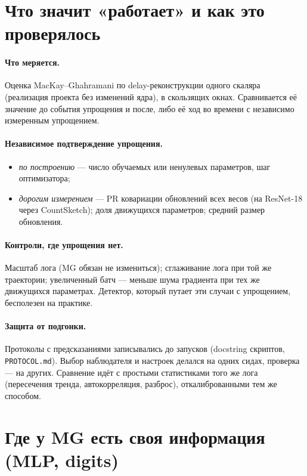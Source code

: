 \documentclass[10pt,a4paper]{article}
\begin{document}
\section{Что значит «работает» и как это проверялось}

\paragraph{Что меряется.} Оценка MacKay--Ghahramani по delay-реконструкции одного
скаляра (реализация проекта без изменений ядра), в скользящих окнах. Сравнивается
её значение до события упрощения и после, либо её ход во времени с независимо
измеренным упрощением.

\paragraph{Независимое подтверждение упрощения.}
\begin{itemize}\setlength\itemsep{0pt}
\item \emph{по построению} --- число обучаемых или ненулевых параметров, шаг
  оптимизатора;
\item \emph{дорогим измерением} --- PR ковариации обновлений всех весов (на
  ResNet-18 через CountSketch); доля движущихся параметров; средний размер
  обновления.
\end{itemize}

\paragraph{Контроли, где упрощения нет.} Масштаб лога (MG обязан не измениться);
сглаживание лога при той же траектории; увеличенный батч --- меньше шума градиента
при тех же движущихся параметрах. Детектор, который путает эти случаи с упрощением,
бесполезен на практике.

\paragraph{Защита от подгонки.} Протоколы с предсказаниями записывались до
запусков (docstring скриптов, \texttt{PROTOCOL.md}). Выбор наблюдателя и настроек
делался на одних сидах, проверка --- на других. Сравнение идёт с простыми
статистиками того же лога (пересечения тренда, автокорреляция, разброс),
откалиброванными тем же способом.

\section{Где у MG есть своя информация (MLP, digits)}
\end{document}
